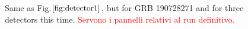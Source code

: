 \documentclass[binding=0.6cm, LaM]{sapthesis}
\newcommand{\fpg}[1]{\textcolor{red}{#1} }
\begin{document}
        \begin{figure}[!t]
          \noindent
          \label{detector2}
          \centering
          \caption{Same as Fig.$\ref{fig:detector1}$, but for GRB 190728271 and for three detectors this time. \fpg{Servono i pannelli relativi al run definitivo.}}
          \label{fig:detector2}
        \end{figure}
\end{document}
